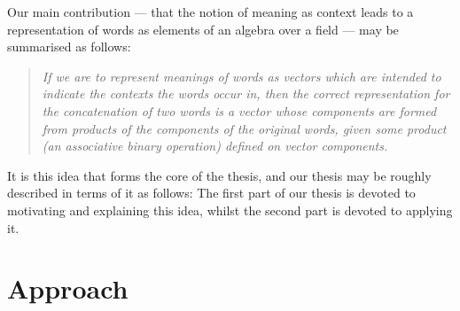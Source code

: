 \documentclass[12pt]{report}
\begin{document}
Our main contribution --- that the notion of meaning as context leads to a representation of words as elements of an algebra over a field --- may be summarised as follows:
\begin{quote}
\emph{If we are to represent meanings of words as vectors which are intended to indicate the contexts the words occur in, then the correct representation for the concatenation of two words is a vector whose components are formed from products of the components of the original words, given some product (an associative binary operation) defined on vector components.}
\end{quote}
It is this idea that forms the core of the thesis, and our thesis may be roughly described in terms of it as follows: The first part of our thesis is devoted to motivating and explaining this idea, whilst the second part is devoted to applying it.

\section{Approach}
\end{document}
